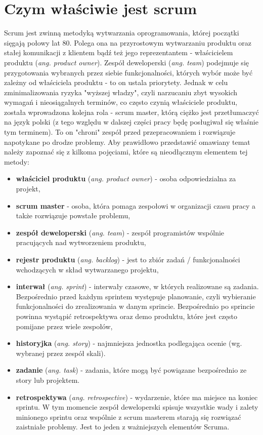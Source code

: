 \section{Czym właściwie jest scrum}
Scrum jest zwinną metodyką wytwarzania oprogramowania, której początki sięgają połowy lat 80. Polega ona na przyrostowym wytwarzaniu produktu oraz stałej komunikacji z klientem bądź też jego reprezentantem - właścicielem produktu (\textit{ang. product owner}). Zespół deweloperski ({\textit{ang. team}}) podejmuje się przygotowania wybranych przez siebie funkcjonalności, których wybór może być zależny od właściciela produktu - to on ustala priorytety. Jednak w celu zminimalizowania ryzyka "wyższej władzy", czyli narzucaniu zbyt wysokich wymagań i nieosiągalnych terminów, co często czynią właściciele produktu, została wprowadzona kolejna rola - scrum master, którą ciężko jest przetłumaczyć na język polski (z tego względu w dalszej części pracy będę posługiwał się właśnie tym terminem). To on "chroni" zespół przed przepracowaniem i rozwiązuje napotykane po drodze problemy. Aby prawidłowo przedstawić omawiany temat należy zapoznać się z kilkoma pojęciami, które są nieodłącznym elementem tej metody:
\begin{itemize}
	\item \textbf{właściciel produktu} (\textit{ang. product owner}) - osoba odpowiedzialna za projekt,
	\item \textbf{scrum master} - osoba, która pomaga zespołowi w organizacji czasu pracy a także rozwiązuje powstałe problemu,
	\item \textbf{zespół deweloperski} (\textit{ang. team}) - zespół programistów wspólnie pracujących nad wytworzeniem produktu,
	\item \textbf{rejestr produktu} (\textit{ang. backlog}) - jest to zbiór zadań / funkcjonalności wchodzących w skład wytwarzanego projektu,
	\item \textbf{interwał} (\textit{ang. sprint}) - interwały czasowe, w których realizowane są zadania. Bezpośrednio przed każdym sprintem występuje planowanie, czyli wybieranie funkcjonalności do zrealizowania w danym sprincie. Bezpośrednio po sprincie powinna wystąpić retrospektywa oraz demo produktu, które jest często pomijane przez wiele zespołów,
	\item \textbf{historyjka} (\textit{ang. story}) - najmniejsza jednostka podlegająca ocenie (wg. wybranej przez zespół skali). 
	\item \textbf{zadanie} (\textit{ang. task}) - zadania, które mogą być powiązane bezpośrednio ze story lub projektem.
	\item \textbf{retrospektywa} (\textit{ang. retrospective}) - wydarzenie, które ma miejsce na koniec sprintu. W tym momencie zespół deweloperski spisuje wszystkie wady i zalety minionego sprintu oraz wspólnie z scrum masterem starają się rozwiązać zaistniałe problemy. Jest to jeden z ważniejszych elementów Scruma.
\end{itemize} 

